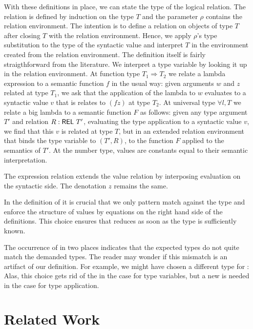 \documentclass[acmsmall,anonymous,review,screen]{acmart}
\begin{document}
With these definitions in place, we can state the type of the logical relation.
\LogicalMCVType
The relation is defined by induction on the type $T$ and the parameter
$\rho$ contains the relation environment. The intention is to define a
relation on objects of type $T$ after closing $T$ with the relation
environment. Hence, we apply $\rho$'s type substitution to the type of
the syntactic value and interpret $T$ in the environment created from
the relation environment.
\LogicalMCVBody
The definition itself is fairly straigthforward from the literature.
We interpret a type variable by looking it up in the relation
environment.
At function type $T_1 \Rightarrow T_2$ we relate a lambda expression
to a semantic function $f$ in
the usual way: given arguments $w$ and $z$ related at type $T_1$, we ask that the
application of the lambda to $w$ evaluates to a syntactic value $v$ that is
relates to $(f z)$ at type $T_2$.
At universal type $\forall l, T$ we relate a big lambda to a semantic
function $F$ as follows: given any type argument $T'$ and relation $R :
\AREL\ T'$, evaluating the type application to a syntactic value $v$,
we find that this $v$ is related at type $T$, but in an extended
relation environment that binds the type variable to $(T', R)$, to the
function $F$ applied to the semantics of $T'$.
At the number type, values are constants equal to their semantic
interpretation. 

The expression relation extends the value relation by interposing
evaluation on the syntactic side. The denotation $z$ remains the
same. 
\LogicalMCE

In the definition of {\AV} it is crucial that we only pattern match
against the type and enforce the structure of values by equations on
the right hand side of the definitions. This choice ensures that {\AV}
reduces as soon as the type is sufficiently known.

The occurrence of {\Asubst} in two places indicates that the expected types do not quite
match the demanded types. The reader may wonder if this mismatch is an
artifact of our definition. For example, we might have chosen a
different type for {\AV}:
\LogicalVariationMCVType
Alas, this choice gets rid of the {\Asubst} in the case for type
variables, but a new {\Asubst} is needed in the case for type
application.

\section{Related Work}
\label{sec:related-work}
\end{document}
